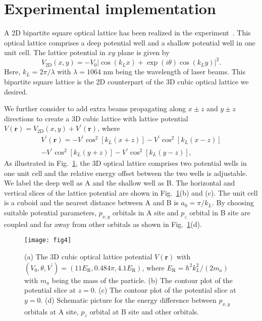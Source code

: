 \documentclass[aps,pra,floatfix,twocolumn,superscriptaddress]{revtex4-1}
\begin{document}
\section{Experimental implementation}
\label{Experimental}
A 2D bipartite square optical lattice has been realized in the experiment~\cite{Wirth2011}. This optical lattice comprises a deep potential well and a shallow potential well in one unit cell. The lattice potential in $xy$ plane is given by
\begin{equation}
V_\mathrm{2D}(x,y)=-V_0\left|\cos(k_Lx)+\exp(i\theta)\cos(k_Ly)\right|^2.
\end{equation}
Here, $k_L=2\pi/\lambda$ with $\lambda=1064$ nm being the wavelength of laser beams. This bipartite square lattice is the 2D counterpart of the 3D cubic optical lattice we desired.

We further consider to add extra beams propagating along $x\pm z$ and $y\pm z$ directions to create a 3D cubic lattice with lattice potential  $V(\mathbf{r})=V_\mathrm{2D}(x,y)+V^{\prime}(\mathbf{r})$, where 
\begin{eqnarray}
V^{\prime}(\mathbf{r})=-V^\prime\cos^{2}[k_{L}(x+z)]-V^\prime\cos^{2}[k_{L}(x-z)]\nonumber\\
-V^\prime\cos^{2}[k_{L}(y+z)]-V^\prime\cos^{2}[k_{L}(y-z)],
\end{eqnarray}
As illustrated in Fig.~\ref{fig4}, the 3D optical lattice comprises two potential wells in one unit cell and the relative energy offset between the two wells is adjustable. We label the deep well as A and the shallow well as B. The horizontal and vertical slices of the lattice potential are shown in Fig.~\ref{fig4}(b) and (c). The unit cell is a cuboid and the nearest distance between A and B is $a_0=\pi/k_L$. By choosing suitable potential parameters, $p_{x,y}$ orbitals in A site and $p_z$ orbital in B site are coupled and far away from other orbitals as shown in Fig.~\ref{fig4}(d).

\begin{figure}[htbp]
	\centering
	\texttt{[image: fig4]}
	\caption{(a) The 3D cubic optical lattice potential $V(\mathbf{r})$ with $(V_0,\theta,V^\prime)=(11 E_\mathrm{R},0.484\pi,4.1 E_\mathrm{R})$, where $E_\mathrm{R}=\hbar^2k_L^2/(2m_a)$ with $m_a$ being the mass of the particle. (b) The contour plot of the potential slice at $z=0$. (c) The contour plot of the potential slice at $y=0$. (d) Schematic picture for the energy difference between $p_{x,y}$ orbitals at A site, $p_z$ orbital at B site and other orbitals.}
	\label{fig4}
\end{figure}
\end{document}

